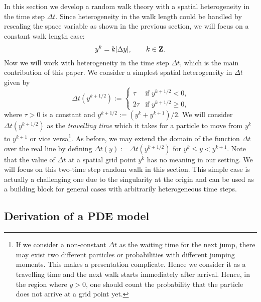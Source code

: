 \documentclass[11pt]{amsart}
\def\Z{{\bf Z}}
\begin{document}
In this section we develop a random walk theory with a spatial heterogeneity in the time step $\Delta t$. Since heterogeneity in the walk length could be handled by rescaling the space variable as shown in the previous section, we will focus on a constant walk length case:
\begin{equation*}\label{y^k}
y^k=k|\Delta y|,\qquad k\in\Z.
\end{equation*}
Now we will work with heterogeneity in the time step $\Delta t$, which is the main contribution of this paper. We consider a simplest spatial heterogeneity in $\Delta t$ given by
\begin{equation*}\label{gamma}
\Delta t(y^{k+1/2}):=
\begin{cases}
\tau & \text{if $y^{k+1/2}<0$,}\\
2\tau & \text{if $y^{k+1/2}\geq 0$,}
\end{cases}
\end{equation*}
where $\tau>0$ is a constant and $y^{k+1/2}:=(y^k+y^{k+1})/2$. We will consider $\Delta t(y^{k+1/2})$ as the \emph{travelling time} which it takes for a particle to move from $y^k$ to $y^{k+1}$ or vice versa\footnote{If we consider a non-constant $\Delta t$ as the waiting time for the next jump, there may exist two different particles or probabilities with different jumping moments. This makes a presentation complicate. Hence we consider it as a travelling time and the next walk starts immediately after arrival. Hence, in the region where $y>0$, one should count the probability that the particle does not arrive at a grid point yet.}. As before, we may extend  the domain of the function $\Delta t$ over the real line by defining $\Delta t(y):=\Delta t(y^{k+1/2})$ for $y^k\leq y<y^{k+1}$. Note that the value of $\Delta t$ at a spatial grid point $y^k$ has no meaning in our setting. We will focus on this two-time step random walk in this section. This simple case is actually a challenging one due to the singularity at the origin and can be used as a building block for general cases with arbitrarily heterogeneous time steps.

\subsection{Derivation of a PDE model}
\end{document}

